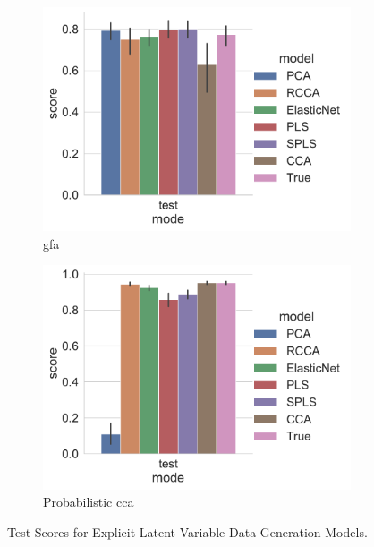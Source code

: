 \begin{figure}
\centering
\begin{subfigure}{0.49\linewidth}
\centering
\includegraphics[width=\linewidth]{figures/simulated/low/Train_Test_Scores_Identity_Covariance_explicit}
\caption{\acrshort{gfa}}
\end{subfigure}
%
\begin{subfigure}{0.49\linewidth}
\centering
\includegraphics[width=\linewidth]{figures/simulated/low/Train_Test_Scores_Random_Covariance_explicit}
\caption{Probabilistic \acrshort{cca}}
\end{subfigure}
\caption{Test Scores for Explicit Latent Variable Data Generation Models.}\label{fig:latent-variable-scores}
\end{figure}

